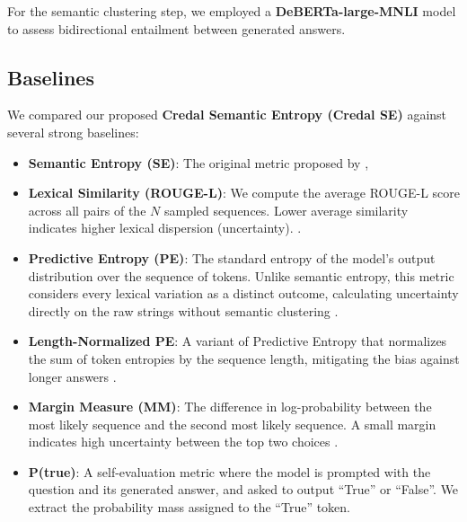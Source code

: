 For the semantic clustering step, we employed a \textbf{DeBERTa-large-MNLI}
model \parencite{he2021debertadecodingenhancedbertdisentangled} to assess
bidirectional entailment between generated answers.

\subsection{Baselines}
\label{sec:experiments:setup:baselines}
We compared our proposed \textbf{Credal Semantic Entropy (Credal SE)}
against several strong baselines:

\begin{itemize}
	\item \textbf{Semantic Entropy (SE)}: The original
	    metric proposed by 
	    \textcite{kuhn2023semanticuncertaintylinguisticinvariances},

	\item \textbf{Lexical Similarity (ROUGE-L)}: We compute the average
	    ROUGE-L score across all pairs of the $N$ sampled sequences.
	    Lower average similarity indicates higher lexical dispersion
	    (uncertainty).
	    \parencite{lin-2004-rouge}.

	\item \textbf{Predictive Entropy (PE)}: The standard entropy of the 
	    model's output distribution over the sequence of tokens.
	    Unlike semantic entropy, this metric considers every lexical 
	    variation as a distinct outcome, calculating uncertainty
	    directly on the raw strings without semantic clustering
	    \parencite{malinin2021uncertaintyestimationautoregressivestructured}.

	\item \textbf{Length-Normalized PE}: A variant of Predictive Entropy
	    that normalizes the sum of token entropies by the sequence 
	    length, mitigating the bias against longer answers
	    \parencite{malinin2021uncertaintyestimationautoregressivestructured}.

	\item \textbf{Margin Measure (MM)}: The difference in
	    log-probability between the most likely sequence and the second
	    most likely sequence. A small margin indicates high uncertainty
	    between the top two choices \parencite{lin-etal-2022-towards}.

	\item \textbf{P(true)}: A self-evaluation metric 
	    \parencite{kadavath2022languagemodelsmostlyknow} 
	    where the model is prompted with the question and its generated
	    answer, and asked to output ``True'' or ``False''. We extract the
	    probability mass assigned to the ``True'' token.
\end{itemize}

